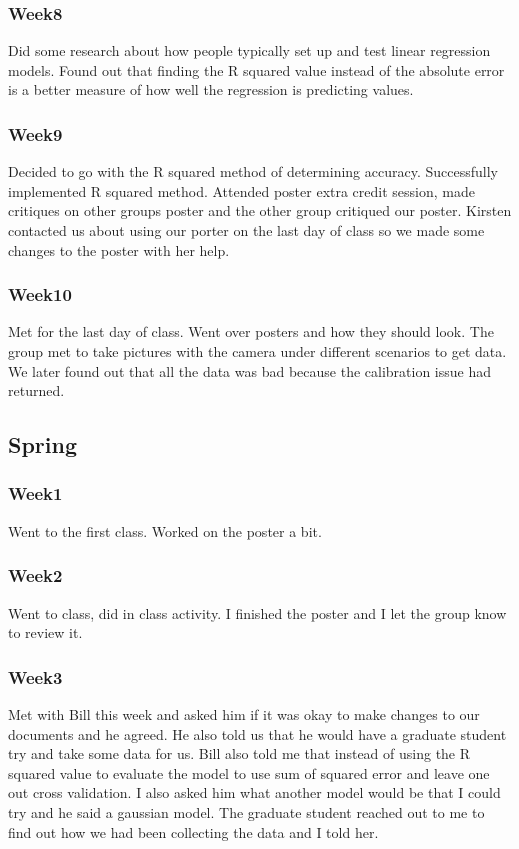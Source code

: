 \subsubsection*{Week8}
Did some research about how people typically set up and test linear regression models. Found out that finding the R squared value instead of the absolute error is a better measure of how well the regression is predicting values.
\subsubsection*{Week9}
Decided to go with the R squared method of determining accuracy. Successfully implemented R squared method. Attended poster extra credit session, made critiques on other groups poster and the other group critiqued our poster. Kirsten contacted us about using our porter on the last day of class so we made some changes to the poster with her help.
\subsubsection*{Week10}
Met for the last day of class. Went over posters and how they should look. The group met to take pictures with the camera under different scenarios to get data. We later found out that all the data was bad because the calibration issue had returned.
\subsection*{Spring}
\subsubsection*{Week1}
Went to the first class. Worked on the poster a bit.
\subsubsection*{Week2}
Went to class, did in class activity. I finished the poster and I let the group know to review it. 
\subsubsection*{Week3}
Met with Bill this week and asked him if it was okay to make changes to our documents and he agreed. He also told us that he would have a graduate student try and take some data for us. Bill also told me that instead of using the R squared value to evaluate the model to use sum of squared error and leave one out cross validation. I also asked him what another model would be that I could try and he said a gaussian model. The graduate student reached out to me to find out how we had been collecting the data and I told her.
